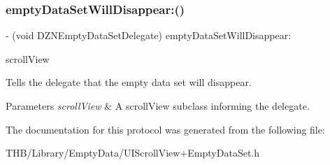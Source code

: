 \subsubsection{\texorpdfstring{empty\+Data\+Set\+Will\+Disappear\+:()}{emptyDataSetWillDisappear:()}}
{\footnotesize\ttfamily -\/ (void D\+Z\+N\+Empty\+Data\+Set\+Delegate) empty\+Data\+Set\+Will\+Disappear\+: \begin{DoxyParamCaption}\item[{(U\+I\+Scroll\+View $\ast$)}]{scroll\+View }\end{DoxyParamCaption}\hspace{0.3cm}{\ttfamily [optional]}}

Tells the delegate that the empty data set will disappear.


\begin{DoxyParams}{Parameters}
{\em scroll\+View} & A scroll\+View subclass informing the delegate. \\
\hline
\end{DoxyParams}


The documentation for this protocol was generated from the following file\+:\begin{DoxyCompactItemize}
\item 
T\+H\+B/\+Library/\+Empty\+Data/U\+I\+Scroll\+View+\+Empty\+Data\+Set.\+h\end{DoxyCompactItemize}
